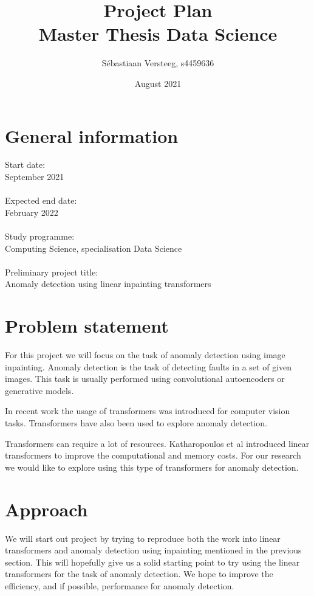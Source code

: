 \documentclass{article}
\title{Project Plan \\ \large{Master Thesis Data Science}}
\author{S\'ebastiaan Versteeg, s4459636}
\date{August 2021}
\begin{document}
\maketitle

\section{General information}

Start date:\\
September 2021\\
\\
Expected end date:\\
February 2022\\
\\
Study programme:\\
Computing Science, specialisation Data Science\\
\\
Preliminary project title:\\
Anomaly detection using linear inpainting transformers\\

\section{Problem statement}
\label{problem-statement}

For this project we will focus on the task of anomaly detection using image inpainting. Anomaly detection is the task of detecting faults in a set of given images. 
This task is usually performed using convolutional autoencoders\cite{tsai_autoencoder-based_2021} or generative models\cite{xie_semisupervised_2021}.

In recent work the usage of transformers was introduced for computer vision tasks\cite{wu_visual_2020}. Transformers have also been used to explore anomaly detection\cite{pirnay_inpainting_2021}.

Transformers can require a lot of resources. Katharopoulos et al introduced linear transformers\cite{katharopoulos_transformers_2020} to improve the computational and memory costs. For our research we would like to explore using this type of transformers for anomaly detection.

\section{Approach}

We will start out project by trying to reproduce both the work into linear transformers and anomaly detection using inpainting mentioned in the previous section.
This will hopefully give us a solid starting point to try using the linear transformers for the task of anomaly detection. We hope to improve the efficiency, and if possible, performance for anomaly detection.
\end{document}
